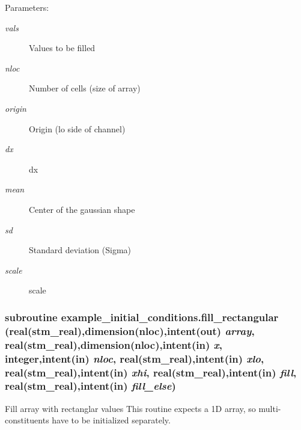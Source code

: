 \begin{Desc}
\item[Parameters:]
\begin{description}
\item[{\em vals}]Values to be filled\item[{\em nloc}]Number of cells (size of array) \item[{\em origin}]Origin (lo side of channel)\item[{\em dx}]dx\item[{\em mean}]Center of the gaussian shape\item[{\em sd}]Standard deviation (Sigma)\item[{\em scale}]scale \end{description}
\end{Desc}
\hypertarget{a00059_2c5f8860d37203d2477701c003e4afa3}{
\subsubsection[{fill\_\-rectangular}]{\setlength{\rightskip}{0pt plus 5cm}subroutine example\_\-initial\_\-conditions.fill\_\-rectangular (real(stm\_\-real),dimension(nloc),intent(out) {\em array}, \/  real(stm\_\-real),dimension(nloc),intent(in) {\em x}, \/  integer,intent(in) {\em nloc}, \/  real(stm\_\-real),intent(in) {\em xlo}, \/  real(stm\_\-real),intent(in) {\em xhi}, \/  real(stm\_\-real),intent(in) {\em fill}, \/  real(stm\_\-real),intent(in) {\em fill\_\-else})}}
\label{a00059_2c5f8860d37203d2477701c003e4afa3}


Fill array with rectanglar values This routine expects a 1D array, so multi-constituents have to be initialized separately. 

